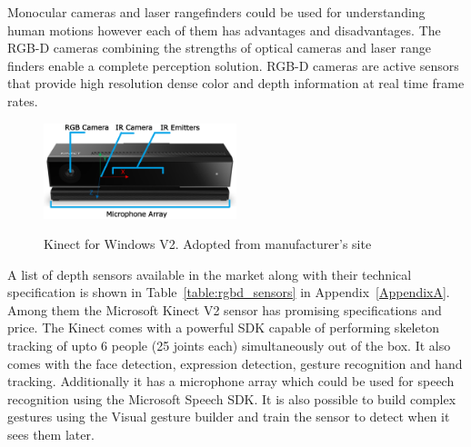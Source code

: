 Monocular cameras and laser rangefinders could be used for understanding human motions however each of them has advantages and disadvantages. The RGB-D cameras combining the strengths of optical cameras and laser range finders enable a complete perception solution. RGB-D cameras \cite{ren2013change} are active sensors that provide high resolution dense color and depth information at real time frame rates.
\begin{figure}[H]
\centering
\includegraphics[width=0.5\textwidth]{assets/kinectv2_parts.eps}
\label{fig:kinectv2}
\caption[Kinect for Windows V2]{Kinect for Windows V2. {Adopted from manufacturer's site}}
\end{figure}
A list of depth sensors available in the market along with their technical specification is shown in Table~\ref{table:rgbd_sensors} in Appendix~\ref{AppendixA}. Among them the Microsoft Kinect V2 \cite{Kinect2014} sensor has promising specifications and price. The Kinect comes with a powerful SDK \cite{KinectSDK2014} capable of performing skeleton tracking of upto 6 people (25 joints each) simultaneously out of the box. It also comes with the face detection, expression detection, gesture recognition and hand tracking. Additionally it has a microphone array which could be used for speech recognition using the Microsoft Speech SDK. It is also possible to build complex gestures using the Visual gesture builder and train the sensor to detect when it sees them later. 

